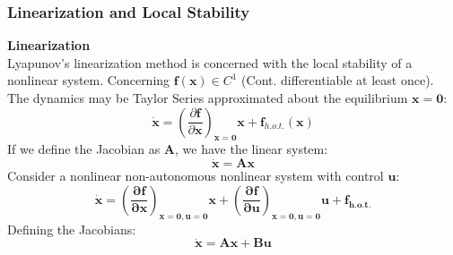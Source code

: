 \documentclass[11pt,handout]{beamer}   %
\begin{document}
\begin{frame}
\frametitle{Linearization and Local Stability}
\small
\textbf{Linearization}\\
Lyapunov's linearization method is concerned with the local stability of a nonlinear system. Concerning $\mathbf{f(x)} \in C^1$ (Cont. differentiable at least once). The dynamics may be Taylor Series approximated about the equilibrium $\mathbf{x = 0}$:
\begin{equation*}
\mathbf{\dot{x}} = \left. \left( \frac{\partial \mathbf{f}}{\partial \mathbf{x}} \right) \right. _{\mathbf{x = 0}}\mathbf{x} + \mathbf{f}_{h.o.t.}(\mathbf{x})
\end{equation*}
If we define the Jacobian as $\mathbf{A}$, we have the linear system:
\begin{equation*}
\mathbf{\dot{x} = Ax}
\end{equation*}
Consider a nonlinear non-autonomous nonlinear system with control $\mathbf{u}$: 
\begin{equation*}
\mathbf{\dot{x} = \left. \left( \frac{\partial \mathbf{f}}{\partial \mathbf{x}} \right) \right. _{\mathbf{x=0,u = 0}}\mathbf{x} + \left. \left( \frac{\partial \mathbf{f}}{\partial \mathbf{u}} \right) \right. _{\mathbf{x=0,u = 0}}\mathbf{u} + \mathbf{f}_{h.o.t.}}
\end{equation*}
Defining the Jacobians:
\begin{equation*}
\mathbf{\dot{x}=Ax+Bu}
\end{equation*}
\end{frame}
\end{document}
